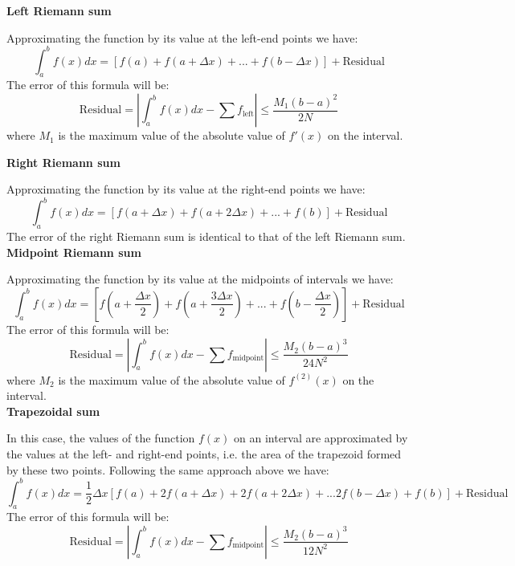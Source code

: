 \textbf{Left Riemann sum}

Approximating the function by its value at the left-end points we have:
\begin{equation}
	\int_a^b f(x) dx = \left[ f(a) + f(a + \Delta x) + ... + f(b - \Delta x) \right] + \text{Residual}
\end{equation}
The error of this formula will be:
\begin{equation}
	\text{Residual} = \left| \int_a^b f(x) dx - \sum f_\text{left} \right| \leq \frac{M_1(b-a)^2}{2N}
\end{equation}
where $M_1$ is the maximum value of the absolute value of $f'(x)$ on the interval.

\textbf{Right Riemann sum}

Approximating the function by its value at the right-end points we have:
\begin{equation}
	\int_a^b f(x) dx = \left[ f(a + \Delta x) + f(a + 2\Delta x) + ... + f(b) \right] + \text{Residual}
\end{equation}
The error of the right Riemann sum is identical to that of the left Riemann sum.
\\


\textbf{Midpoint Riemann sum}

Approximating the function by its value at the midpoints of intervals we have:
\begin{equation}
	\int_a^b f(x) dx = \left[ f(a + \frac{\Delta x}{2}) + f(a + \frac{3\Delta x}{2}) + ... + f(b - \frac{\Delta x}{2}) \right] + \text{Residual}
\end{equation}
The error of this formula will be:
\begin{equation}
	\text{Residual} = \left| \int_a^b f(x) dx - \sum f_\text{midpoint} \right| \leq \frac{M_2(b-a)^3}{24N^2}
\end{equation}
where $M_2$ is the maximum value of the absolute value of $f^{(2)}(x)$ on the interval.
\\


\textbf{Trapezoidal sum}

In this case, the values of the function $f(x)$ on an interval are approximated by the values at the left- and right-end points, i.e. the area of the trapezoid formed by these two points. Following the same approach above we have:
\begin{equation}
	\int_a^b f(x) dx = \frac{1}{2} \Delta x \left[ f(a) + 2f(a + \Delta x) + 2f(a + 2\Delta x) + ... 2f(b - \Delta x) + f(b) \right] + \text{Residual}
\end{equation}
The error of this formula will be:
\begin{equation}
	\text{Residual} = \left| \int_a^b f(x) dx - \sum f_\text{midpoint} \right| \leq \frac{M_2(b-a)^3}{12N^2}
\end{equation}
\\


